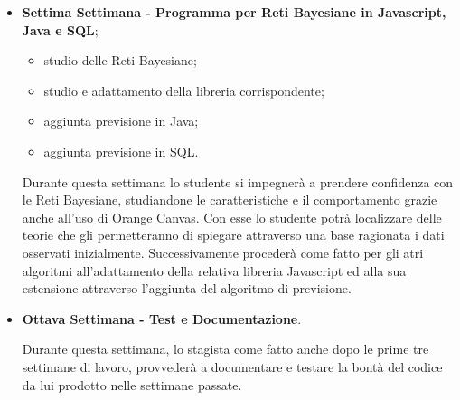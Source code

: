 \begin{itemize}
	\item \textbf{Settima Settimana - Programma per Reti Bayesiane in Javascript, Java e SQL};
\begin{itemize}
	\item studio delle Reti Bayesiane;
	\item studio e adattamento della libreria corrispondente;
	\item aggiunta previsione in Java;
	\item aggiunta previsione in SQL.
	\end{itemize}
	Durante questa settimana lo studente si impegnerà a prendere confidenza con le Reti Bayesiane, studiandone le caratteristiche e il comportamento grazie anche all'uso di Orange Canvas. Con esse lo studente potrà localizzare delle teorie che gli permetteranno di spiegare attraverso una base ragionata i dati osservati inizialmente. Successivamente procederà come fatto per gli atri algoritmi all'adattamento della relativa libreria Javascript ed alla sua estensione attraverso l'aggiunta del algoritmo di previsione.
	
	\item \textbf{Ottava Settimana - Test e Documentazione}.
	 \par Durante questa settimana, lo stagista come fatto anche dopo le prime tre settimane di lavoro, provvederà a documentare e testare la bontà del codice da lui prodotto nelle settimane passate.

\end{itemize}